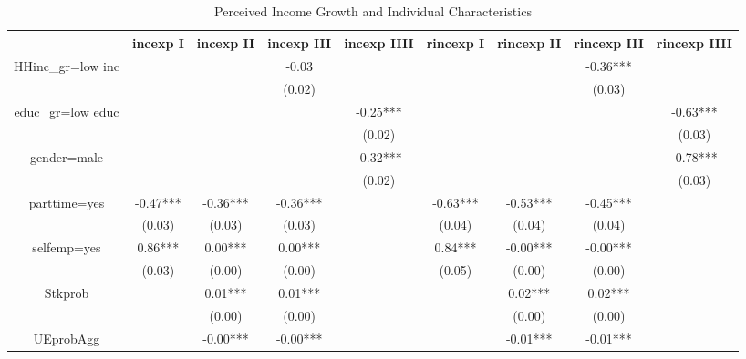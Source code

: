 \documentclass[12pt,notitlepage,onecolumn,aps,pra]{article}
\begin{document}
       
\begin{table}[p]
\centering
\begin{adjustbox}{width={0.9\textwidth}}
\begin{threeparttable}
\caption{Perceived Income Growth and Individual Characteristics}
\label{micro_reg_exp}

\begin{tabular}{ccccccccc}
\hline 
{} &  incexp I & incexp II & incexp III & incexp IIII & rincexp I & rincexp II & rincexp III & rincexp IIII \\
\hline 
HHinc\_gr=low inc &           &           &      -0.03 &             &           &            &    -0.36*** &              \\
                 &           &           &     (0.02) &             &           &            &      (0.03) &              \\
educ\_gr=low educ &           &           &            &    -0.25*** &           &            &             &     -0.63*** \\
                 &           &           &            &      (0.02) &           &            &             &       (0.03) \\
gender=male      &           &           &            &    -0.32*** &           &            &             &     -0.78*** \\
                 &           &           &            &      (0.02) &           &            &             &       (0.03) \\
parttime=yes     &  -0.47*** &  -0.36*** &   -0.36*** &             &  -0.63*** &   -0.53*** &    -0.45*** &              \\
                 &    (0.03) &    (0.03) &     (0.03) &             &    (0.04) &     (0.04) &      (0.04) &              \\
selfemp=yes      &   0.86*** &   0.00*** &    0.00*** &             &   0.84*** &   -0.00*** &    -0.00*** &              \\
                 &    (0.03) &    (0.00) &     (0.00) &             &    (0.05) &     (0.00) &      (0.00) &              \\
Stkprob          &           &   0.01*** &    0.01*** &             &           &    0.02*** &     0.02*** &              \\
                 &           &    (0.00) &     (0.00) &             &           &     (0.00) &      (0.00) &              \\
UEprobAgg        &           &  -0.00*** &   -0.00*** &             &           &   -0.01*** &    -0.01*** &              \\

\end{tabular}
\end{threeparttable}
\end{adjustbox}
\end{table}
\end{document}
